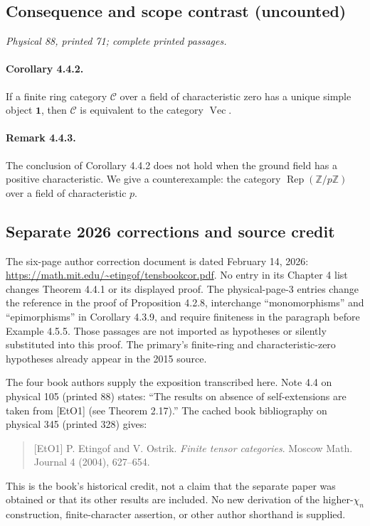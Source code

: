 \documentclass[11pt]{article}
\DeclareMathOperator{\Rep}{Rep}
\newcommand{\Cat}{\mathcal C}
\newcommand{\unit}{\mathbf 1}
\newcommand{\BookVec}{\operatorname{Vec}}
\begin{document}
\subsection*{Consequence and scope contrast (uncounted)}
\noindent\emph{Physical 88, printed 71; complete printed passages.}
\paragraph{Corollary 4.4.2.}
If a finite ring category $\Cat$ over a field of characteristic zero
has a unique simple object $\unit$, then $\Cat$ is equivalent to the
category $\BookVec$.

\paragraph{Remark 4.4.3.}
The conclusion of Corollary 4.4.2 does not hold when the ground field
has a positive characteristic. We give a counterexample: the category
$\Rep(\mathbb Z/p\mathbb Z)$ over a field of characteristic $p$.

\subsection*{Separate 2026 corrections and source credit}
The six-page author correction document is dated February 14, 2026:
\url{https://math.mit.edu/~etingof/tensbookcor.pdf}.
No entry in its Chapter 4 list changes Theorem 4.4.1 or its displayed
proof. The physical-page-3 entries change the reference in the proof
of Proposition 4.2.8, interchange ``monomorphisms'' and
``epimorphisms'' in Corollary 4.3.9, and require finiteness in the
paragraph before Example 4.5.5. Those passages are not imported as
hypotheses or silently substituted into this proof. The primary's
finite-ring and characteristic-zero hypotheses already appear in
the 2015 source.

The four book authors supply the exposition transcribed here.
Note 4.4 on physical 105 (printed 88) states: ``The results on absence
of self-extensions are taken from [EtO1] (see Theorem 2.17).''
The cached book bibliography on physical 345 (printed 328) gives:
\begin{quote}
[EtO1] P. Etingof and V. Ostrik. \emph{Finite tensor categories}.
Moscow Math. Journal 4 (2004), 627--654.
\end{quote}
This is the book's historical credit, not a claim that the separate
paper was obtained or that its other results are included. No new
derivation of the higher-$\chi_n$ construction, finite-character
assertion, or other author shorthand is supplied.
\end{document}
